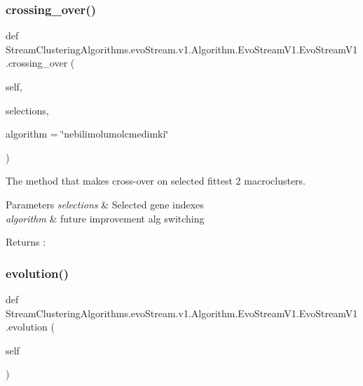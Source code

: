 \subsubsection{\texorpdfstring{crossing\+\_\+over()}{crossing\_over()}}
{\footnotesize\ttfamily def Stream\+Clustering\+Algorithms.\+evo\+Stream.\+v1.\+Algorithm.\+Evo\+Stream\+V1.\+Evo\+Stream\+V1.\+crossing\+\_\+over (\begin{DoxyParamCaption}\item[{}]{self,  }\item[{}]{selections,  }\item[{}]{algorithm = {\ttfamily \char`\"{}nebilimolumolcmedimki\char`\"{}} }\end{DoxyParamCaption})}



The method that makes cross-\/over on selected fittest 2 macroclusters. 


\begin{DoxyParams}{Parameters}
{\em selections} & Selected gene indexes \\
\hline
{\em algorithm} & future improvement alg switching \\
\hline
\end{DoxyParams}
\begin{DoxyReturn}{Returns}
\+: 
\end{DoxyReturn}
\mbox{\label{classStreamClusteringAlgorithms_1_1evoStream_1_1v1_1_1Algorithm_1_1EvoStreamV1_1_1EvoStreamV1_a1e337e7c8fc00e3fdc4948e5e160e130}} 
\subsubsection{\texorpdfstring{evolution()}{evolution()}}
{\footnotesize\ttfamily def Stream\+Clustering\+Algorithms.\+evo\+Stream.\+v1.\+Algorithm.\+Evo\+Stream\+V1.\+Evo\+Stream\+V1.\+evolution (\begin{DoxyParamCaption}\item[{}]{self }\end{DoxyParamCaption})}

